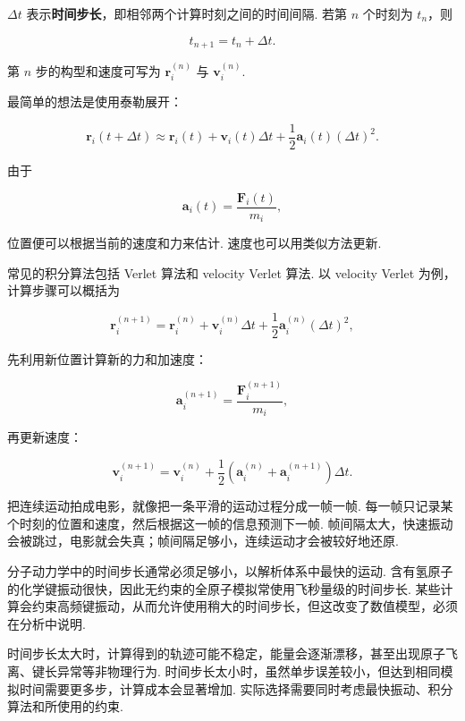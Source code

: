 \documentclass[UTF8,11pt,a4paper,openany]{ctexbook}
\newcommand{\term}[1]{\textbf{#1}}
\begin{document}
\begin{notationbox}
$\Delta t$ 表示\term{时间步长}，即相邻两个计算时刻之间的时间间隔. 若第 $n$ 个时刻为 $t_n$，则

\[
t_{n+1}=t_n+\Delta t.
\]

第 $n$ 步的构型和速度可写为 $\mathbf r_i^{(n)}$ 与 $\mathbf v_i^{(n)}$. 
\end{notationbox}

最简单的想法是使用泰勒展开：

\[
\mathbf r_i(t+\Delta t)
\approx
\mathbf r_i(t)
+
\mathbf v_i(t)\Delta t
+
\frac{1}{2}\mathbf a_i(t)(\Delta t)^2.
\]

由于

\[
\mathbf a_i(t)=\frac{\mathbf F_i(t)}{m_i},
\]

位置便可以根据当前的速度和力来估计. 速度也可以用类似方法更新. 

常见的积分算法包括 Verlet 算法和 velocity Verlet 算法. 以 velocity Verlet 为例，计算步骤可以概括为

\[
\mathbf r_i^{(n+1)}
=
\mathbf r_i^{(n)}
+
\mathbf v_i^{(n)}\Delta t
+
\frac{1}{2}\mathbf a_i^{(n)}(\Delta t)^2,
\]

先利用新位置计算新的力和加速度：

\[
\mathbf a_i^{(n+1)}
=
\frac{\mathbf F_i^{(n+1)}}{m_i},
\]

再更新速度：

\[
\mathbf v_i^{(n+1)}
=
\mathbf v_i^{(n)}
+
\frac{1}{2}
\left(
\mathbf a_i^{(n)}
+
\mathbf a_i^{(n+1)}
\right)\Delta t.
\]

\begin{analogybox}
把连续运动拍成电影，就像把一条平滑的运动过程分成一帧一帧. 每一帧只记录某个时刻的位置和速度，然后根据这一帧的信息预测下一帧. 帧间隔太大，快速振动会被跳过，电影就会失真；帧间隔足够小，连续运动才会被较好地还原. 
\end{analogybox}

分子动力学中的时间步长通常必须足够小，以解析体系中最快的运动. 含有氢原子的化学键振动很快，因此无约束的全原子模拟常使用飞秒量级的时间步长. 某些计算会约束高频键振动，从而允许使用稍大的时间步长，但这改变了数值模型，必须在分析中说明. 

\begin{limitbox}
时间步长太大时，计算得到的轨迹可能不稳定，能量会逐渐漂移，甚至出现原子飞离、键长异常等非物理行为. 时间步长太小时，虽然单步误差较小，但达到相同模拟时间需要更多步，计算成本会显著增加. 实际选择需要同时考虑最快振动、积分算法和所使用的约束. 
\end{limitbox}
\end{document}
